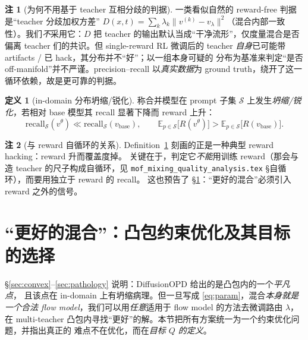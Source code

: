 \documentclass[11pt,a4paper]{article}
\newcommand{\E}{\mathbb{E}}
\newcommand{\base}{\mathrm{base}}
\newcommand{\stu}{\theta}
\theoremstyle{definition}
\newtheorem{definition}{定义}
\newtheorem{remark}{注}
\begin{document}
\begin{remark}[为何不用基于 teacher 互相分歧的判据]
\label{rem:no_drift}
一类看似自然的 reward-free 判据是``teacher 分歧加权方差''
$D(x,t)=\sum_k\lambda_k\|v^{(k)}-v_\lambda\|^2$（混合内部一致性）。我们\emph{不}采用它：$D$ 把
teacher 的输出默认当成``干净流形''，仅度量混合是否偏离 teacher 们的共识。但 single-reward RL
微调后的 teacher \emph{自身}已可能带 artifacts / 已 hack，其分布并不``好''；以一组本身可疑的
分布为基准来判定``是否 off-manifold''并不严谨。precision--recall 以\emph{真实数据}为 ground
truth，绕开了这一循环依赖，故是更可靠的判据。
\end{remark}

\begin{definition}[in-domain 分布坍缩/锐化]
\label{def:collapse}
称合并模型在 prompt 子集 $\mathcal{S}$ 上发生\emph{坍缩/锐化}，若相对 base 模型其
recall 显著下降而 reward 上升：
\begin{equation}
\mathrm{recall}_{\mathcal{S}}(v^\stu)\ll \mathrm{recall}_{\mathcal{S}}(v_{\base}),
\qquad
\E_{p\in\mathcal{S}}\big[R(v^\stu)\big]>\E_{p\in\mathcal{S}}\big[R(v_{\base})\big].
\end{equation}
\end{definition}

\begin{remark}[与 reward 自循环的关系]
Definition~\ref{def:collapse} 刻画的正是一种典型 reward hacking：reward 升而覆盖度掉。
关键在于，判定它\emph{不能}用训练 reward（那会与造 teacher 的尺子构成自循环，见
\texttt{mof\_mixing\_quality\_analysis.tex} \S 自循环），而要用独立于 reward 的 recall。
这也预告了 \S\ref{sec:better}：``更好的混合''必须引入 reward 之外的信号。
\end{remark}

\section{``更好的混合''：凸包约束优化及其目标的选择}
\label{sec:better}

\S\ref{sec:convex}--\ref{sec:pathology} 说明：DiffusionOPD 给出的是凸包内的一个\emph{平凡点}，
且该点在 in-domain 上有坍缩病理。但一旦写成 \eqref{eq:param}，混合\emph{本身就是一个合法
flow model}，我们可以用\emph{任意}适用于 flow model 的方法去微调路由 $\lambda$，在
multi-teacher 凸包内寻找``更好''的解。本节把所有方案统一为一个约束优化问题，并指出真正的
难点不在优化，而在\emph{目标 $Q$ 的定义}。
\end{document}
